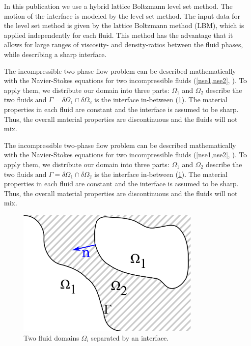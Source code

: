 \documentclass[final,leqno,onefignum,onetabnum]{siamltexmm}
\begin{document}
In this publication we use a hybrid lattice Boltzmann level set method. The motion of the interface is modeled by the level set method. The input data for the level set method is given by the lattice Boltzmann method (LBM), which is applied independently for each fluid. This method has the advantage that it allows for large ranges of viscosity- and density-ratios between the fluid phases, while describing a sharp interface.

The incompressible two-phase flow problem can be described mathematically with the Navier-Stokes equations for two incompressible fluids (\cref{nse1,nse2}, \cite{ferziger}). To apply them, we distribute our domain into three parts: $\Omega_1$ and $\Omega_2$ describe the two fluids and $\Gamma = \delta\Omega_1 \cap \delta\Omega_2$ is the interface in-between (\cref{intro_phases}). The material properties in each fluid are constant and the interface is assumed to be sharp. Thus, the overall material properties are discontinuous and the fluids will not mix.


The incompressible two-phase flow problem can be described mathematically with the Navier-Stokes equations for two incompressible fluids (\cref{nse1,nse2}, \cite{ferziger}). To apply them, we distribute our domain into three parts: $\Omega_1$ and $\Omega_2$ describe the two fluids and $\Gamma = \delta\Omega_1 \cap \delta\Omega_2$ is the interface in-between (\cref{intro_phases}). The material properties in each fluid are constant and the interface is assumed to be sharp. Thus, the overall material properties are discontinuous and the fluids will not mix.

\begin{figure}[h!]
	\flushright
	\hfill\includegraphics[width=9cm,natwidth=1690,natheight=1174]{skizze.png}\hspace*{\fill}
	\caption{Two fluid domains $\Omega_i$ separated by an interface.}
	\label{intro_phases}
\end{figure}
\end{document}

